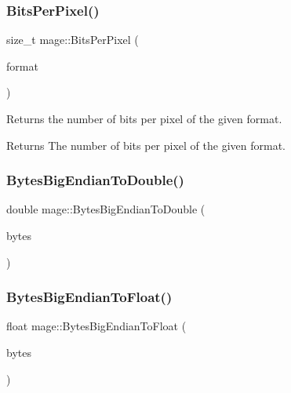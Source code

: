 \subsubsection{\texorpdfstring{Bits\+Per\+Pixel()}{BitsPerPixel()}}
{\footnotesize\ttfamily size\+\_\+t mage\+::\+Bits\+Per\+Pixel (\begin{DoxyParamCaption}\item[{D\+X\+G\+I\+\_\+\+F\+O\+R\+M\+AT}]{format }\end{DoxyParamCaption})}

Returns the number of bits per pixel of the given format.

\begin{DoxyReturn}{Returns}
The number of bits per pixel of the given format. 
\end{DoxyReturn}
\hypertarget{namespacemage_a348085d95b0f0d2276cf9fad8a8d8b1d}{}\label{namespacemage_a348085d95b0f0d2276cf9fad8a8d8b1d} 
\subsubsection{\texorpdfstring{Bytes\+Big\+Endian\+To\+Double()}{BytesBigEndianToDouble()}}
{\footnotesize\ttfamily double mage\+::\+Bytes\+Big\+Endian\+To\+Double (\begin{DoxyParamCaption}\item[{const uint8\+\_\+t $\ast$}]{bytes }\end{DoxyParamCaption})}

\hypertarget{namespacemage_ae184a2848f1a490c58f617a9d93b3c88}{}\label{namespacemage_ae184a2848f1a490c58f617a9d93b3c88} 
\subsubsection{\texorpdfstring{Bytes\+Big\+Endian\+To\+Float()}{BytesBigEndianToFloat()}}
{\footnotesize\ttfamily float mage\+::\+Bytes\+Big\+Endian\+To\+Float (\begin{DoxyParamCaption}\item[{const uint8\+\_\+t $\ast$}]{bytes }\end{DoxyParamCaption})}

\hypertarget{namespacemage_a67572c654c8ede11eed23c9c556e439f}{}\label{namespacemage_a67572c654c8ede11eed23c9c556e439f} 
